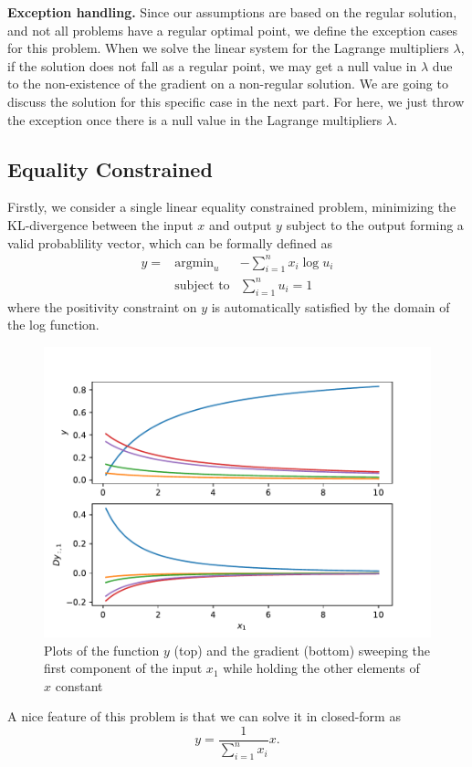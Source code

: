 \par \textbf{Exception handling.}
Since our assumptions are based on the regular solution, and not all problems have a regular optimal point, we define the exception cases for this problem. When we solve the linear system for the Lagrange multipliers $\lambda$, if the solution does not fall as a regular point, we may get a null value in $\lambda$ due to the non-existence of the gradient on a non-regular solution. We are going to discuss the solution for this specific case in the next part. For here, we just throw the exception once there is a null value in the Lagrange multipliers $\lambda$. 

\subsection{Equality Constrained}
Firstly, we consider a single linear equality constrained problem, minimizing the KL-divergence between the input $x$ and output $y$ subject to the output forming a valid probablility vector, which can be formally defined as 
\begin{equation}
    \begin{array}{rll}
        y =& \text{argmin}_u & - \sum_{i=1}^{n} x_i \log u_i \\
        & \text{subject to} & \sum_{i=1}^{n} u_i = 1
    \end{array}
\end{equation}
where the positivity constraint on $y$ is automatically satisfied by the domain of the log function.
\begin{figure}[t]
    \label{fig:equ-lin-eg}
    \centering
    \includegraphics[page=1,width=.8\textwidth]{figs/linear_equality_example.pdf} 
    \caption{Plots of the function $y$ (top) and the gradient (bottom) sweeping the first component of the input $x_1$ while holding the other elements of $x$ constant}
\end{figure}
\par A nice feature of this problem is that we can solve it in closed-form as
$$
y = \frac{1}{\sum_{i=1}^{n} x_i} x.
$$

